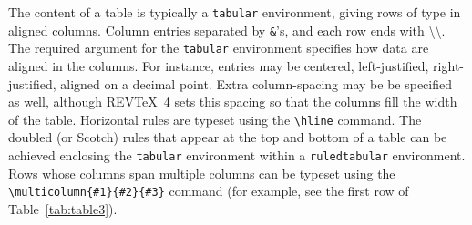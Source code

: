 \documentclass[%
reprint,
amsmath,amssymb,
aps,
]{revtex4-2}
\begin{document}
		The content of a table is typically a \texttt{tabular} environment, 
		giving rows of type in aligned columns. 
		Column entries separated by \verb+&+'s, and 
		each row ends with \textbackslash\textbackslash. 
		The required argument for the \texttt{tabular} environment
		specifies how data are aligned in the columns. 
		For instance, entries may be centered, left-justified, right-justified, aligned on a decimal
		point. 
		Extra column-spacing may be be specified as well, 
		although REV\TeX~4 sets this spacing so that the columns fill the width of the
		table. Horizontal rules are typeset using the \verb+\hline+
		command. The doubled (or Scotch) rules that appear at the top and
		bottom of a table can be achieved enclosing the \texttt{tabular}
		environment within a \texttt{ruledtabular} environment. Rows whose
		columns span multiple columns can be typeset using the
		\verb+\multicolumn{#1}{#2}{#3}+ command (for example, see the first
		row of Table~\ref{tab:table3}).%
		
\end{document}
